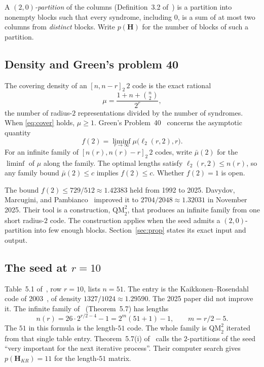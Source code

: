 \documentclass[11pt,a4paper]{article}
\newcommand{\HH}{\boldsymbol{H}}
\newcommand{\ellr}{\ell_2}
\theoremstyle{remark}
\begin{document}
A \emph{$(2,0)$-partition} of the columns (Definition~3.2
of~\cite{DMP2025}) is a partition into nonempty blocks such that every
syndrome, including $0$, is a sum of at most two columns from
\emph{distinct} blocks. Write $p(\HH)$ for the number of blocks of such
a partition.

\subsection{Density and Green's problem 40}

The covering density of an $[n,n-r]_2\,2$ code is the exact rational
\[
\mu=\frac{1+n+\binom{n}{2}}{2^r},
\]
the number of radius-$2$ representations divided by the number of
syndromes. When \eqref{eq:cover} holds, $\mu\ge 1$. Green's
Problem~40~\cite{Green} concerns the asymptotic quantity
\[
f(2)=\liminf_{r\to\infty}\mu\bigl(\ellr(r,2),r\bigr).
\]
For an infinite family of $[n(r),n(r)-r]_2\,2$ codes, write
$\bar\mu(2)$ for the $\liminf$ of $\mu$ along the family. The optimal
lengths satisfy $\ellr(r,2)\le n(r)$, so any family bound
$\bar\mu(2)\le c$ implies $f(2)\le c$. Whether $f(2)=1$ is open.

The bound $f(2)\le 729/512\approx 1.42383$ held from 1992 to 2025.
Davydov, Marcugini, and Pambianco~\cite{DMP2025} improved it to
$2704/2048\approx 1.32031$ in November 2025. Their tool is a
construction, $\mathrm{QM}_2^2$, that produces an infinite family from
one short radius-$2$ code. The construction applies when the seed
admits a $(2,0)$-partition into few enough blocks.
Section~\ref{sec:prop} states its exact input and output.

\subsection{The seed at $r=10$}

Table~5.1 of~\cite{DMP2025}, row $r=10$, lists $n=51$. The entry is the
Kaikkonen--Rosendahl code of 2003~\cite{KR2003}, of density
$1327/1024\approx 1.29590$. The 2025 paper did not improve it. The
infinite family of~\cite{DMP2025} (Theorem~5.7) has lengths
\[
n(r)=26\cdot 2^{r/2-4}-1=2^{m}(51+1)-1,\qquad m=r/2-5 .
\]
The $51$ in this formula is the length-$51$ code. The whole family is
$\mathrm{QM}_2^2$ iterated from that single table entry. Theorem~5.7(i)
of~\cite{DMP2025} calls the $2$-partitions of the seed ``very important
for the next iterative process''. Their computer search gives
$p(\HH_{KR})=11$ for the length-$51$ matrix.
\end{document}
